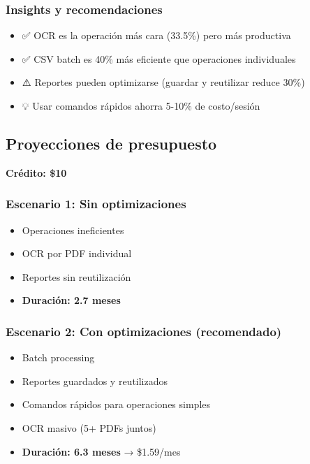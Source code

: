 \documentclass[12pt,oneside]{article}
\begin{document}
\subsubsection{Insights y recomendaciones}

\begin{itemize}
    \item ✅ OCR es la operación más cara (33.5\%) pero más productiva
    \item ✅ CSV batch es 40\% más eficiente que operaciones individuales
    \item ⚠️ Reportes pueden optimizarse (guardar y reutilizar reduce 30\%)
    \item 💡 Usar comandos rápidos ahorra 5-10\% de costo/sesión
\end{itemize}

\subsection{Proyecciones de presupuesto}

\textbf{Crédito: \$10}

\subsubsection{Escenario 1: Sin optimizaciones}

\begin{itemize}
    \item Operaciones ineficientes
    \item OCR por PDF individual
    \item Reportes sin reutilización
    \item \textbf{Duración: 2.7 meses}
\end{itemize}

\subsubsection{Escenario 2: Con optimizaciones (recomendado)}

\begin{itemize}
    \item Batch processing
    \item Reportes guardados y reutilizados
    \item Comandos rápidos para operaciones simples
    \item OCR masivo (5+ PDFs juntos)
    \item \textbf{Duración: 6.3 meses} → \$1.59/mes
\end{itemize}
\end{document}
